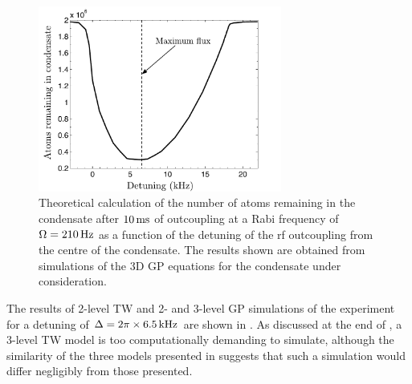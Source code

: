 \begin{figure}
    \centering
    \includegraphics[width=8cm]{DetuningCurve}
    \caption{Theoretical calculation of the number of atoms remaining in the condensate after $\unit[10]{ms}$ of outcoupling at a Rabi frequency of $\Omega = \unit[210]{Hz}$ as a function of the detuning of the rf outcoupling from the centre of the condensate. The results shown are obtained from simulations of the 3D GP equations for the condensate under consideration. \label{Peaks:DetuningCurve}}
\end{figure}

The results of 2-level TW and 2- and 3-level GP simulations of the experiment for a detuning of $\Delta = 2\pi \times \unit[6.5]{kHz}$ are shown in . As discussed at the end of , a 3-level TW model is too computationally demanding to simulate, although the similarity of the three models presented in  suggests that such a simulation would differ negligibly from those presented.

